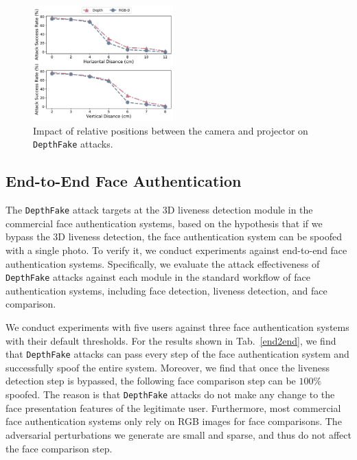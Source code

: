 \begin{figure}[pt]
	\centerline{\includegraphics[width = 0.48\textwidth]{figures/related_position.pdf}}
	\vspace{-0.1in}
	\caption{Impact of relative positions between the camera and projector on \texttt{DepthFake} attacks. }
	\label{realted_position}
	\vspace{-0.1in}
\end{figure}



\subsection{End-to-End Face Authentication}

The \texttt{DepthFake} attack targets at the 3D liveness detection module in the commercial face authentication systems, based on the hypothesis that if we bypass the 3D liveness detection,  the face authentication system can be spoofed with a single photo.
To verify it,  we conduct experiments against end-to-end face authentication systems. Specifically, we evaluate the attack effectiveness of \texttt{DepthFake} attacks against each module in the standard workflow of face authentication systems, including face detection, liveness detection, and face comparison. 

We conduct experiments with five users against three face authentication systems with their default thresholds.
For the results shown in Tab.~\ref{end2end}, we find that \texttt{DepthFake} attacks can pass every step of the face authentication system and successfully spoof the entire system. Moreover, we find that once the liveness detection step is bypassed, the following face comparison step can be $100\%$ spoofed. The reason is that \texttt{DepthFake} attacks do not make any change to the face presentation features of the legitimate user. Furthermore, most commercial face authentication systems only rely on RGB images for face comparisons. The adversarial perturbations we generate are small and sparse, and thus do not affect the face comparison step.


